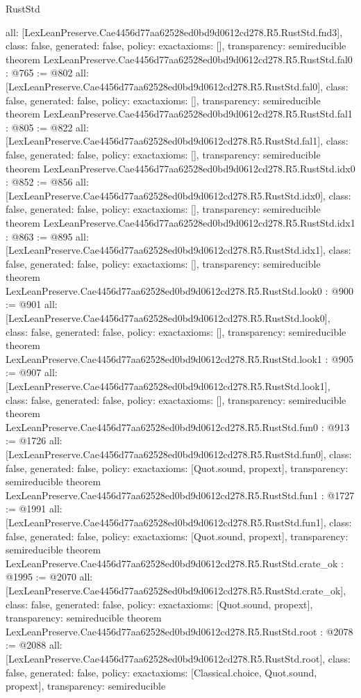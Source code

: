 \begin{lexlean}{RustStd}
\begin{coremodule}
{  all: [LexLeanPreserve.Cae4456d77aa62528ed0bd9d0612cd278.R5.RustStd.fnd3],
  class: false,
  generated: false,
  policy: exact{axioms: []},
  transparency: semireducible
}
theorem LexLeanPreserve.Cae4456d77aa62528ed0bd9d0612cd278.R5.RustStd.fal0 : @765 := @802 {
  all: [LexLeanPreserve.Cae4456d77aa62528ed0bd9d0612cd278.R5.RustStd.fal0],
  class: false,
  generated: false,
  policy: exact{axioms: []},
  transparency: semireducible
}
theorem LexLeanPreserve.Cae4456d77aa62528ed0bd9d0612cd278.R5.RustStd.fal1 : @805 := @822 {
  all: [LexLeanPreserve.Cae4456d77aa62528ed0bd9d0612cd278.R5.RustStd.fal1],
  class: false,
  generated: false,
  policy: exact{axioms: []},
  transparency: semireducible
}
theorem LexLeanPreserve.Cae4456d77aa62528ed0bd9d0612cd278.R5.RustStd.idx0 : @852 := @856 {
  all: [LexLeanPreserve.Cae4456d77aa62528ed0bd9d0612cd278.R5.RustStd.idx0],
  class: false,
  generated: false,
  policy: exact{axioms: []},
  transparency: semireducible
}
theorem LexLeanPreserve.Cae4456d77aa62528ed0bd9d0612cd278.R5.RustStd.idx1 : @863 := @895 {
  all: [LexLeanPreserve.Cae4456d77aa62528ed0bd9d0612cd278.R5.RustStd.idx1],
  class: false,
  generated: false,
  policy: exact{axioms: []},
  transparency: semireducible
}
theorem LexLeanPreserve.Cae4456d77aa62528ed0bd9d0612cd278.R5.RustStd.look0 : @900 := @901 {
  all: [LexLeanPreserve.Cae4456d77aa62528ed0bd9d0612cd278.R5.RustStd.look0],
  class: false,
  generated: false,
  policy: exact{axioms: []},
  transparency: semireducible
}
theorem LexLeanPreserve.Cae4456d77aa62528ed0bd9d0612cd278.R5.RustStd.look1 : @905 := @907 {
  all: [LexLeanPreserve.Cae4456d77aa62528ed0bd9d0612cd278.R5.RustStd.look1],
  class: false,
  generated: false,
  policy: exact{axioms: []},
  transparency: semireducible
}
theorem LexLeanPreserve.Cae4456d77aa62528ed0bd9d0612cd278.R5.RustStd.fun0 : @913 := @1726 {
  all: [LexLeanPreserve.Cae4456d77aa62528ed0bd9d0612cd278.R5.RustStd.fun0],
  class: false,
  generated: false,
  policy: exact{axioms: [Quot.sound, propext]},
  transparency: semireducible
}
theorem LexLeanPreserve.Cae4456d77aa62528ed0bd9d0612cd278.R5.RustStd.fun1 : @1727 := @1991 {
  all: [LexLeanPreserve.Cae4456d77aa62528ed0bd9d0612cd278.R5.RustStd.fun1],
  class: false,
  generated: false,
  policy: exact{axioms: [Quot.sound, propext]},
  transparency: semireducible
}
theorem LexLeanPreserve.Cae4456d77aa62528ed0bd9d0612cd278.R5.RustStd.crate_ok : @1995 := @2070 {
  all: [LexLeanPreserve.Cae4456d77aa62528ed0bd9d0612cd278.R5.RustStd.crate_ok],
  class: false,
  generated: false,
  policy: exact{axioms: [Quot.sound, propext]},
  transparency: semireducible
}
theorem LexLeanPreserve.Cae4456d77aa62528ed0bd9d0612cd278.R5.RustStd.root : @2078 := @2088 {
  all: [LexLeanPreserve.Cae4456d77aa62528ed0bd9d0612cd278.R5.RustStd.root],
  class: false,
  generated: false,
  policy: exact{axioms: [Classical.choice, Quot.sound, propext]},
  transparency: semireducible
}


\end{coremodule}
\end{lexlean}
